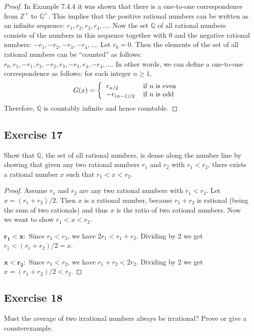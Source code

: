 \documentclass[14pt]{extarticle}
\newcommand{\Q}{\mathbb{Q}}
\newcommand{\Z}{\mathbb{Z}}
\begin{document}
\begin{proof}
    In Example 7.4.4 it was shown that there is a one-to-one correspondence from $\Z^+$ to $\Q^+$. This implies that the
    positive rational numbers can be written as an infinite sequence: \(r_1, r_2, r_3, r_4, \ldots\). Now the set $\Q$
    of all rational numbers consists of the numbers in this sequence together with 0 and the negative rational numbers:
    \(-r_1, -r_2, -r_3, -r_4, \ldots\). Let \(r_0 = 0\). Then the elements of the set of all rational numbers can be
    “counted” as follows: \(r_0, r_1, -r_1, r_2, -r_2, r_3, -r_ 3, r_4, -r_4, \ldots\). In other words, we can define a
    one-to-one correspondence as follows: for each integer \(n \geq 1\),
    \[
        G(x) =
        \left\{
        \begin{tabular}{ll}
            \(r_{n/2}\)      & if \(n\) is even \\
            \(-r_{(n-1)/2}\) & if \(n\) is odd
        \end{tabular}
        \right.
    \]
    Therefore, $\Q$ is countably infinite and hence countable.
\end{proof}

\subsection{Exercise 17}
Show that $\Q$, the set of all rational numbers, is dense along the number line by showing that given any two
rational numbers $r_1$ and $r_2$ with \(r_1 < r_2\), there exists a rational number $x$ such that \(r_1 < x < r_2\).

\begin{proof}
    Assume $r_1$ and $r_2$ are any two rational numbers with \(r_1 < r_2\). Let \(x = (r_1 + r_2) / 2\). Then $x$ is a
    rational number, because $r_1 + r_2$ is rational (being the sum of two rationals) and thus $x$ is the ratio of two
    rational numbers. Now we want to show \(r_1 < x < r_2\).

    \(\bm{r_1 < x}:\) Since \(r_1 < r_2\), we have \(2r_1 < r_1 + r_2\). Dividing by 2 we get \(r_1 < (r_1 + r_2)/2 = x\).

    \(\bm{x < r_2}:\) Since \(r_1 < r_2\), we have \(r_1 + r_2 < 2r_2\). Dividing by 2 we get \(x = (r_1 + r_2)/2 < r_2\).
\end{proof}

\subsection{Exercise 18}
Must the average of two irrational numbers always be irrational? Prove or give a counterexample.
\end{document}

